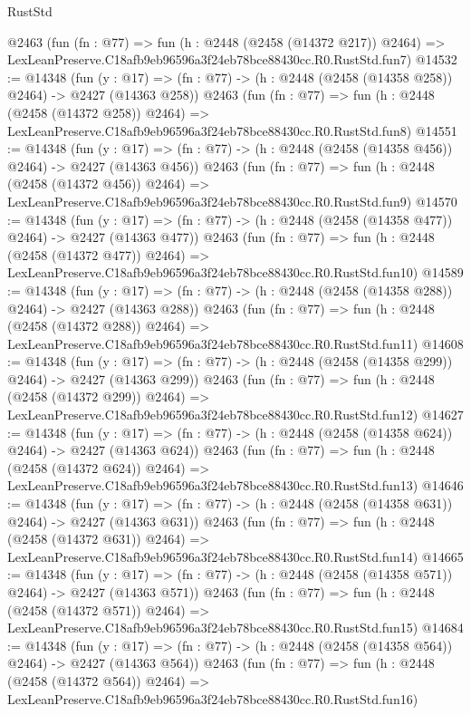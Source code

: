 \begin{lexlean}{RustStd}
\begin{coremodule}
    @2463
    (fun (fn : @77) =>
    fun (h : @2448 (@2458 (@14372 @217)) @2464) =>
    LexLeanPreserve.C18afb9eb96596a3f24eb78bce88430cc.R0.RustStd.fun7)
@14532 := @14348
    (fun (y : @17) => (fn : @77) -> (h : @2448 (@2458 (@14358 @258)) @2464) -> @2427 (@14363 @258))
    @2463
    (fun (fn : @77) =>
    fun (h : @2448 (@2458 (@14372 @258)) @2464) =>
    LexLeanPreserve.C18afb9eb96596a3f24eb78bce88430cc.R0.RustStd.fun8)
@14551 := @14348
    (fun (y : @17) => (fn : @77) -> (h : @2448 (@2458 (@14358 @456)) @2464) -> @2427 (@14363 @456))
    @2463
    (fun (fn : @77) =>
    fun (h : @2448 (@2458 (@14372 @456)) @2464) =>
    LexLeanPreserve.C18afb9eb96596a3f24eb78bce88430cc.R0.RustStd.fun9)
@14570 := @14348
    (fun (y : @17) => (fn : @77) -> (h : @2448 (@2458 (@14358 @477)) @2464) -> @2427 (@14363 @477))
    @2463
    (fun (fn : @77) =>
    fun (h : @2448 (@2458 (@14372 @477)) @2464) =>
    LexLeanPreserve.C18afb9eb96596a3f24eb78bce88430cc.R0.RustStd.fun10)
@14589 := @14348
    (fun (y : @17) => (fn : @77) -> (h : @2448 (@2458 (@14358 @288)) @2464) -> @2427 (@14363 @288))
    @2463
    (fun (fn : @77) =>
    fun (h : @2448 (@2458 (@14372 @288)) @2464) =>
    LexLeanPreserve.C18afb9eb96596a3f24eb78bce88430cc.R0.RustStd.fun11)
@14608 := @14348
    (fun (y : @17) => (fn : @77) -> (h : @2448 (@2458 (@14358 @299)) @2464) -> @2427 (@14363 @299))
    @2463
    (fun (fn : @77) =>
    fun (h : @2448 (@2458 (@14372 @299)) @2464) =>
    LexLeanPreserve.C18afb9eb96596a3f24eb78bce88430cc.R0.RustStd.fun12)
@14627 := @14348
    (fun (y : @17) => (fn : @77) -> (h : @2448 (@2458 (@14358 @624)) @2464) -> @2427 (@14363 @624))
    @2463
    (fun (fn : @77) =>
    fun (h : @2448 (@2458 (@14372 @624)) @2464) =>
    LexLeanPreserve.C18afb9eb96596a3f24eb78bce88430cc.R0.RustStd.fun13)
@14646 := @14348
    (fun (y : @17) => (fn : @77) -> (h : @2448 (@2458 (@14358 @631)) @2464) -> @2427 (@14363 @631))
    @2463
    (fun (fn : @77) =>
    fun (h : @2448 (@2458 (@14372 @631)) @2464) =>
    LexLeanPreserve.C18afb9eb96596a3f24eb78bce88430cc.R0.RustStd.fun14)
@14665 := @14348
    (fun (y : @17) => (fn : @77) -> (h : @2448 (@2458 (@14358 @571)) @2464) -> @2427 (@14363 @571))
    @2463
    (fun (fn : @77) =>
    fun (h : @2448 (@2458 (@14372 @571)) @2464) =>
    LexLeanPreserve.C18afb9eb96596a3f24eb78bce88430cc.R0.RustStd.fun15)
@14684 := @14348
    (fun (y : @17) => (fn : @77) -> (h : @2448 (@2458 (@14358 @564)) @2464) -> @2427 (@14363 @564))
    @2463
    (fun (fn : @77) =>
    fun (h : @2448 (@2458 (@14372 @564)) @2464) =>
    LexLeanPreserve.C18afb9eb96596a3f24eb78bce88430cc.R0.RustStd.fun16)

\end{coremodule}
\end{lexlean}
